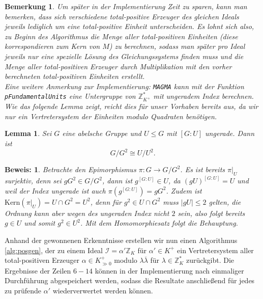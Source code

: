 \documentclass[12pt,a4paper,halfparskip,headsepline,bibtotocnumbered]{scrreprt}
\theoremstyle{nummermitklammern}
\newtheorem{lemma}[defsatzusw]{Lemma}
\newtheorem{bemerkung}[defsatzusw]{Bemerkung}
\theoremstyle{nonumberbreak}
\newtheorem{beweis}{Beweis:}
\newcommand{\Z}{\mathbb{Z}}
\newcommand{\I}{\mathcal{I}}
\begin{document}
\begin{bemerkung}
	Um später in der Implementierung Zeit zu sparen, kann man bemerken, dass sich verschiedene total-positive Erzeuger des gleichen Ideals jeweils lediglich um eine total-positive Einheit unterscheiden. Es lohnt sich also, zu Beginn des Algorithmus die Menge aller total-positiven Einheiten (diese korrespondieren zum Kern von $M$) zu berechnen, sodass man später pro Ideal jeweils nur eine spezielle Lösung des Gleichungssystems finden muss und die Menge aller total-positiven Erzeuger durch Multiplikation mit den vorher berechneten total-positiven Einheiten erstellt.\\
	Eine weitere Anmerkung zur Implementierung: \texttt{MAGMA} kann mit der Funktion\linebreak
	 \texttt{pFundamentalUnits} eine Untergruppe von $\Z_{K^+}^\ast$ mit ungeradem Index berechnen. Wie das folgende Lemma zeigt, reicht dies für unser Vorhaben bereits aus, da wir nur ein Vertretersystem der Einheiten modulo Quadraten benötigen.
\end{bemerkung}

\begin{framed}
	\begin{lemma}
		Sei $G$ eine abelsche Gruppe und $U \leq G$ mit $\left[ G : U \right]$ ungerade. Dann ist
		\begin{equation*}
			G / G^2 \cong U / U^2.
		\end{equation*}
	\end{lemma}
\end{framed}

\begin{beweis}
	Betrachte den Epimorphismus $\pi : G \rightarrow G / G^2$. Es ist bereits $\pi\vert_U$ surjektiv, denn sei $gG^2 \in G / G^2$, dann ist $g^{\left[ G : U \right]} \in U$, da $(gU)^{\left[ G : U \right]} = U$ und weil der Index ungerade ist auch $\pi\left(g^{\left[ G : U \right]}\right) = gG^2$. Zudem ist $\text{Kern}(\pi\vert_U) = U \cap G^2 = U^2$, denn für $g^2 \in U\cap G^2$ muss $\vert gU \vert \leq 2$ gelten, die Ordnung kann aber wegen des ungeraden Index nicht $2$ sein, also folgt bereits $g \in U$ und somit $g^2 \in U^2$. Mit dem Homomorphiesatz folgt die Behauptung.
\end{beweis}


Anhand der gewonnenen Erkenntnisse erstellen wir nun einen Algorithmus \eqref{alg:posgen}, der zu einem Ideal $\I = \alpha' \Z_K$ für $\alpha' \in K^+$ ein Vertretersystem aller total-positiven Erzeuger $\alpha \in K_{\gg 0}^+$ modulo $\lambda \overline{\lambda}$ für $\lambda \in \Z_K^\ast$ zurückgibt. Die Ergebnisse der Zeilen $6 - 14$ können in der Implementierung nach einmaliger Durchführung abgespeichert werden, sodass die Resultate anschließend für jedes zu prüfende $\alpha'$ wiederverwertet werden können. 
\end{document}
